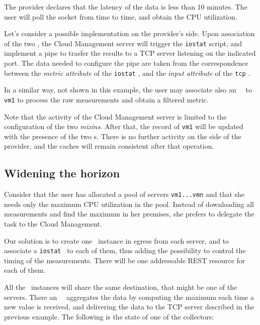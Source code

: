 \documentclass[10pt]{article}  %
\begin{document}
The provider declares that the latency of the data is less than 10 minutes. The user will poll the socket from time to time, and obtain the CPU utilization.

Let's consider a possible implementation on the provider's side. Upon association of the two \mi , the Cloud Management server will trigger the {\tt \small iostat} script, and implement a pipe to trasfer the results to a TCP server listening on the indicated port. The data needed to configure the pipe are taken from the correspondence between the {\em metric attribute} of the {\tt \small iostat} \mi , and the {\em input attribute} of the {\tt \small tcp} \mi .

In a similar way, not shown in this example, the user may associate also an \aggr\ \mi\ to {\tt \small vm1} to process the raw measurements and obtain a filtered metric.

Note that the activity of the Cloud Management server is limited to the configuration of the two {\em mixins}. After that, the record of {\tt \small vm1} will be updated with the presence of the two \mi s. There is no further activity on the side of the provider, and the caches will remain consistent after that operation.

\subsection*{Widening the horizon}

Consider that the user has allocated a pool of servers {\tt \small vm1...vmn} and that she needs only the maximum CPU utilization in the pool. Instead of downloading all measurements and find the maximum in her premises, she prefers to delegate the task to the Cloud Management.

Our solution is to create one \coll\ instance in egress from each server, and to associate a {\tt \small iostat} \mi\ to each of them, thus adding the possibility to control the timing of the measurements. There will be one addressable REST resource for each of them.

All the \coll\ instances will share the same destination, that might be one of the servers. There an \aggr\ \mi\ aggregates the data by computing the maximum each time a new value is received, and delivering the data to the TCP server described in the previous example. The following is the state of one of the collectors:
\end{document}
